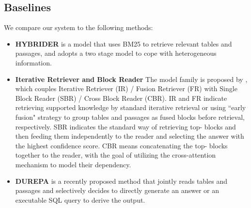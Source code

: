 \documentclass[11pt]{article}
\begin{document}
	\subsection{Baselines}
	We compare our system to the following methods:
	\begin{itemize}
		\item \textbf{HYBRIDER} \cite{chen2020hybridqa} is a model that uses BM25 to retrieve relevant tables and passages, and adopts a two stage model to cope with heterogeneous information.
		\item \textbf{Iterative Retriever and Block Reader} The model family is proposed by \citet{chen2020open}, which couples Iterative Retriever (IR) / Fusion Retriever (FR) with Single Block Reader (SBR) / Cross Block Reader (CBR). IR and FR indicate retrieving supported knowledge by standard iterative retrieval or using ``early fusion" strategy to group tables and passages as fused blocks before retrieval, respectively. SBR indicates the standard way of retrieving top- blocks and then feeding them independently to the reader and selecting the answer with the highest confidence score. CBR means concatenating the top- blocks together to the reader, with the goal of utilizing the cross-attention mechanism to model their dependency. 
		\item \textbf{DUREPA} \cite{li2021dual} is a recently proposed method that jointly reads tables and passages and selectively decides to directly generate an answer or an executable SQL query to derive the output. 
	\end{itemize}
	
\end{document}
